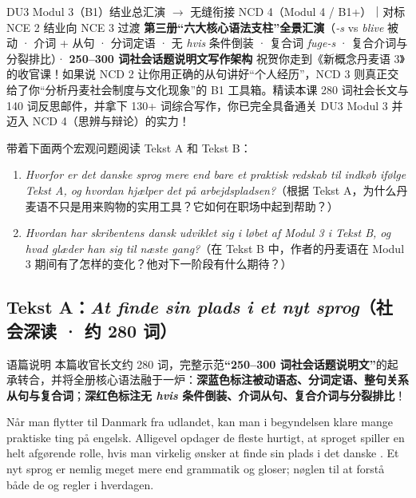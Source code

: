 {DU3 Modul 3（B1）结业总汇演 $\rightarrow$ 无缝衔接 NCD 4（Modul 4 / B1+）｜对标 NCE 2 结业向 NCE 3 过渡}
{\textbf{第三册“六大核心语法支柱”全景汇演}（\textit{-s} vs \textit{blive} 被动 · 介词 + 从句 · 分词定语 · 无 \textit{hvis} 条件倒装 · 复合词 \textit{fuge-s} · 复合介词与分裂排比）· \textbf{250--300 词社会话题说明文写作架构}}
{祝贺你走到《新概念丹麦语 3》的收官课！如果说 NCD 2 让你用正确的从句讲好“个人经历”，NCD 3 则真正交给了你“分析丹麦社会制度与文化现象”的 B1 工具箱。精读本课 280 词社会长文与 140 词反思邮件，并拿下 130+ 词综合写作，你已完全具备通关 DU3 Modul 3 并迈入 NCD 4（思辨与辩论）的实力！}

\begin{foerduleaeser}
带着下面两个宏观问题阅读 Tekst A 和 Tekst B：
\begin{enumerate}
  \item \textit{Hvorfor er det danske sprog mere end bare et praktisk redskab til indkøb ifølge Tekst A, og hvordan hjælper det på arbejdspladsen?}（根据 Tekst A，为什么丹麦语不只是用来购物的实用工具？它如何在职场中起到帮助？）
  \item \textit{Hvordan har skribentens dansk udviklet sig i løbet af Modul 3 i Tekst B, og hvad glæder han sig til næste gang?}（在 Tekst B 中，作者的丹麦语在 Modul 3 期间有了怎样的变化？他对下一阶段有什么期待？）
\end{enumerate}
\end{foerduleaeser}


\subsection*{Tekst A：\textit{At finde sin plads i et nyt sprog}（社会深读 · 约 280 词）}

\begin{tipbox}{语篇说明}
本篇收官长文约 280 词，完整示范\textbf{“250--300 词社会话题说明文”}的起承转合，并将全册核心语法融于一炉：\textbf{\color{NCDNavy}深蓝色标注被动语态、分词定语、整句关系从句与复合词}；\textbf{\color{NCDRed}深红色标注无 \textit{hvis} 条件倒装、介词从句、复合介词与分裂排比}！
\end{tipbox}

Når man flytter til Danmark fra udlandet, kan man i begyndelsen klare mange praktiske ting på engelsk. Alligevel opdager de fleste hurtigt, at sproget spiller en helt afgørende rolle, hvis man virkelig ønsker at finde sin plads i det danske . Et nyt sprog er nemlig meget mere end grammatik og gloser;  nøglen til at forstå både de  og  regler i hverdagen.


